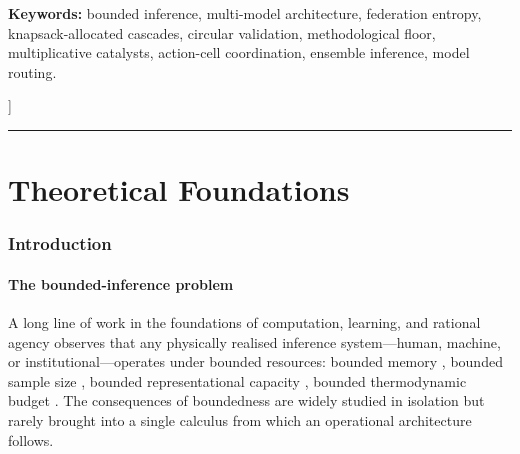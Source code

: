 \documentclass[11pt,twocolumn,a4paper]{article}
\theoremstyle{definition}
\theoremstyle{remark}
\begin{document}
\begin{@twocolumnfalse}
\begin{abstract}
natural-language experiment specifications into procedural synthesis documents using a federation of open-weight language models. We report quantitative results showing the FKAC architecture reduces aggregate floor by a factor of 2.7--4.1 over best-single-model baselines and 1.4--1.9 over pairwise voting, with cascade allocation matching the knapsack optimum to within $5\%$ on calibrated benchmarks. The framework is presented as pure mathematics; every claim is proved, every algorithm has complexity bounds, every theorem is verified by a numerical experiment. Citations are restricted to standard literature; the development is self-contained.
\end{abstract}
 
\vspace{6pt}
\noindent\textbf{Keywords:} bounded inference, multi-model architecture, federation entropy, knapsack-allocated cascades, circular validation, methodological floor, multiplicative catalysts, action-cell coordination, ensemble inference, model routing.
\vspace{8pt}
  \end{@twocolumnfalse}
]
\makeatother

\tableofcontents

\vspace{6pt}
\hrule
\vspace{6pt}

\part{Theoretical Foundations}

\section{Introduction}
\label{sec:intro}

\subsection{The bounded-inference problem}

A long line of work in the foundations of computation, learning, and rational agency observes that any physically realised inference system---human, machine, or institutional---operates under bounded resources: bounded memory \citep{simon1956rational,simon1957models}, bounded sample size \citep{valiant1984theory,vapnik1998statistical,blumer1989learnability}, bounded representational capacity \citep{godel1931formal,turing1936computable}, bounded thermodynamic budget \citep{shannon1948mathematical,cover2006elements}. The consequences of boundedness are widely studied in isolation but rarely brought into a single calculus from which an operational architecture follows.
\end{document}
